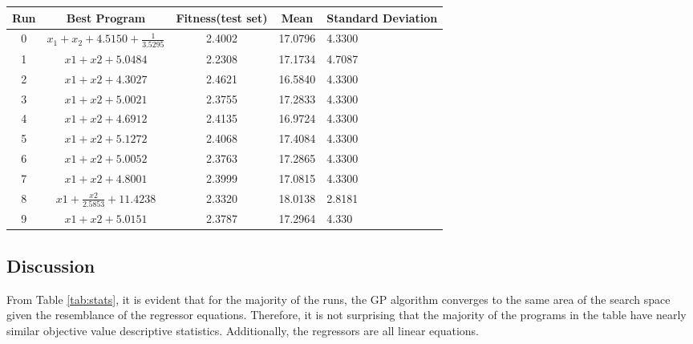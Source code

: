 \documentclass[a4paper,12pt]{article}
\begin{document}
\begin{tabularx}{\textwidth} {
        | c | c | c | c | X |}

    \hline
    \textbf{Run} & \textbf{Best Program}                   & \textbf{Fitness(test set)} & \textbf{Mean} & \textbf{Standard Deviation} \\
    \hline
    0            & $x_1 + x_2 + 4.5150 + \frac{1}{3.5295}$ & 2.4002                     & 17.0796       & 4.3300                      \\
    \hline
    1            & $x1 + x2 + 5.0484$                      & 2.2308                     & 17.1734       & 4.7087                      \\
    \hline
    2            & $x1 + x2 + 4.3027$                      & 2.4621                     & 16.5840       & 4.3300                      \\
    \hline
    3            & $x1 + x2 + 5.0021$                      & 2.3755                     & 17.2833       & 4.3300                      \\
    \hline
    4            & $x1 + x2 + 4.6912$                      & 2.4135                     & 16.9724       & 4.3300                      \\
    \hline
    5            & $x1 + x2 + 5.1272$                      & 2.4068                     & 17.4084       & 4.3300                      \\
    \hline
    6            & $x1 + x2 + 5.0052$                      & 2.3763                     & 17.2865       & 4.3300                      \\
    \hline
    7            & $x1 + x2 + 4.8001$                      & 2.3999                     & 17.0815       & 4.3300                      \\
    \hline
    8            & $x1 + \frac{x2}{2.5853} + 11.4238$      & 2.3320                     & 18.0138       & 2.8181                      \\
    \hline
    9            & $x1 + x2 + 5.0151$                      & 2.3787                     & 17.2964       & 4.330                       \\
    \hline
\end{tabularx}
\label{tab:stats}
\subsection{Discussion}
From Table \ref{tab:stats}, it is evident that for the majority of the runs, the GP algorithm converges to the same area of the search space given the resemblance of the regressor equations. Therefore, it is not surprising that the majority of the programs in the table have nearly similar objective value descriptive statistics. Additionally, the regressors are all linear equations.
\end{document}
